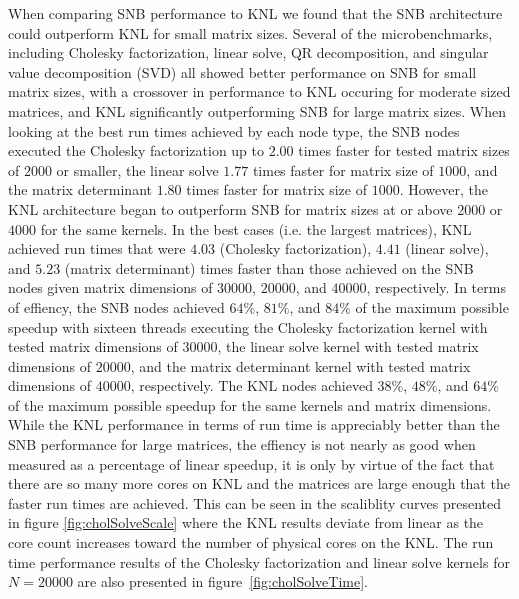 When comparing SNB performance to KNL we found that the SNB architecture could outperform
KNL for small matrix sizes. Several of the microbenchmarks, including Cholesky
factorization, linear solve, QR decomposition, and singular value decomposition (SVD) all
showed better performance on SNB for small matrix sizes, with a crossover in performance
to KNL occuring for moderate sized matrices, and KNL significantly outperforming SNB for
large matrix sizes. When looking at the best run times achieved by each node type, the SNB
nodes executed the Cholesky factorization up to $2.00$ times faster for tested matrix
sizes of $2000$ or smaller, the linear solve $1.77$ times faster for matrix size of
$1000$, and the matrix determinant $1.80$ times faster for matrix size of $1000$. However,
the KNL architecture began to outperform SNB for matrix sizes at or above $2000$ or $4000$
for the same kernels. In the best cases (i.e. the largest matrices), KNL achieved run
times that were $4.03$ (Cholesky factorization), $4.41$ (linear solve), and $5.23$ (matrix
determinant) times faster than those achieved on the SNB nodes given matrix dimensions of
$30000$, $20000$, and $40000$, respectively. In terms of effiency, the SNB nodes achieved
$64\%$, $81\%$, and $84\%$ of the maximum possible speedup with sixteen threads executing
the Cholesky factorization kernel with tested matrix dimensions of $30000$, the linear
solve kernel with tested matrix dimensions of $20000$, and the matrix determinant kernel
with tested matrix dimensions of $40000$, respectively. The KNL nodes achieved $38\%$,
$48\%$, and $64\%$ of the maximum possible speedup for the same kernels and matrix
dimensions. While the KNL performance in terms of run time is appreciably better than the
SNB performance for large matrices, the effiency is not nearly as good when measured as a
percentage of linear speedup, it is only by virtue of the fact that there are so many more
cores on KNL and the matrices are large enough that the faster run times are achieved.
This can be seen in the scaliblity curves presented in figure \ref{fig:cholSolveScale}
where the KNL results deviate from linear as the core count increases toward the number of
physical cores on the KNL. The run time performance results of the Cholesky factorization
and linear solve kernels for $N=20000$ are also presented in
figure~\ref{fig:cholSolveTime}.
